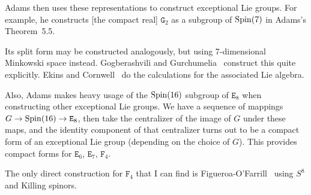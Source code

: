 \M
Adams then uses these representations to construct exceptional Lie
groups. For example, he constructs [the compact real] $\mathtt{G}_{2}$
as a subgroup of $\operatorname{Spin}(7)$ in Adams's Theorem~5.5.

Its split form may be constructed analogously, but using 7-dimensional
Minkowski space instead.
Gogberashvili and Gurchumelia~\cite{Gogberashvili:2019ojg} construct
this quite explicitly. Ekins and Cornwell~\cite{Ekins:1975yu} do the
calculations for the associated Lie algebra.

\M
Also, Adams makes heavy usage of the $\operatorname{Spin}(16)$ subgroup of
$\mathtt{E}_{8}$ when constructing other exceptional Lie groups.
We have a sequence of mappings $G\to\operatorname{Spin}(16)\to\mathtt{E}_{8}$,
then take the centralizer of the image of $G$ under these maps, and the
identity component of that centralizer turns out to be a compact form of
an exceptional Lie group (depending on the choice of $G$).
This provides compact forms for $\mathtt{E}_{6}$, $\mathtt{E}_{7}$,
$\mathtt{F}_{4}$.

The only direct construction for $\mathtt{F}_{4}$
that I can find is Figueroa-O'Farrill~\cite{Figueroa-OFarrill:2007jcv}
using $S^{8}$ and Killing spinors.

